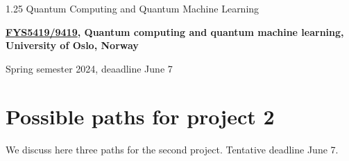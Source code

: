 \documentclass[%
oneside,                 %
final,                   %
10pt]{article}
\begin{document}

\newcommand{\exercisesection}[1]{\subsection*{#1}}






\thispagestyle{empty}

\begin{center}
{\LARGE\bf
\begin{spacing}{1.25}
Quantum Computing and Quantum Machine Learning
\end{spacing}
}
\end{center}


\begin{center}
{\bf \href{{https://www.uio.no/studier/emner/matnat/fys/FYS5419/index-eng.html}}{FYS5419/9419}, Quantum computing and quantum machine learning, University of Oslo, Norway${}^{}$} \\ [0mm]
\end{center}

\begin{center}
\end{center}
    

\begin{center}
Spring semester 2024, deaadline June 7
\end{center}

\vspace{1cm}


\section*{Possible paths for project 2}

We discuss here three paths for the second project.
Tentative deadline June 7.
\end{document}
